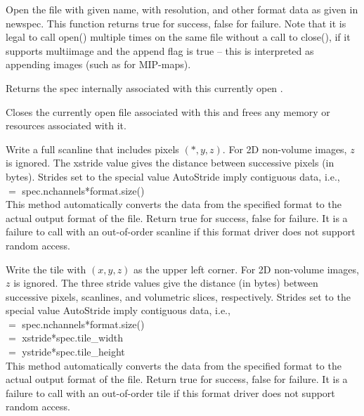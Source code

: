 Open the file with given {\kw name}, with resolution, and other format
data as given in {\kw newspec}.  This function returns {\kw true} for
success, {\kw false} for failure.  Note that it is legal to call {\kw
open()} multiple times on the same file without a call to {\kw
close()}, if it supports multiimage and the append flag is {\kw true}
-- this is interpreted as appending images (such as for MIP-maps).

\apiend

Returns the spec internally associated with this currently open
\ImageOutput.
\apiend

Closes the currently open file associated with this \ImageOutput
and frees any memory or resources associated with it.
\apiend


Write a full scanline that includes pixels $(*,y,z)$.  For 2D non-volume
images, $z$ is ignored.  The {\kw xstride} value gives the distance
between successive pixels (in bytes).  Strides set to the special value
{\kw AutoStride} imply contiguous data, i.e., \\  $=$
{\kw spec.nchannels*format.size()} \\ This method
automatically converts the data from the specified {\kw format} to the
actual output format of the file.  Return {\kw true} for success, {\kw
  false} for failure.  It is a failure to call \writescanline with an
out-of-order scanline if this format driver does not support random
access.

\apiend


Write the tile with $(x,y,z)$ as the upper left corner.  For 2D
non-volume images, $z$ is ignored.  The three stride values give the
distance (in bytes) between successive pixels, scanlines, and volumetric
slices, respectively.  Strides set to the special value {\kw AutoStride}
imply contiguous data, i.e., \\
 $=$ {\kw spec.nchannels*format.size()} \\
 $=$ {\kw xstride*spec.tile_width} \\
 $=$ {\kw ystride*spec.tile_height} \\
This method automatically converts the
data from the specified {\kw format} to the actual output format of the
file.  Return {\kw true} for success, {\kw false} for failure.  It is a
failure to call \writetile with an out-of-order tile if this
format driver does not support random access.

